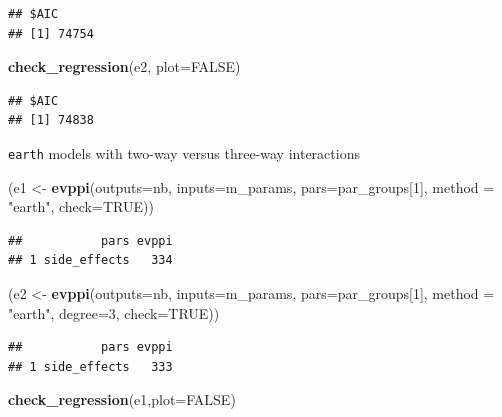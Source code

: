 \documentclass[
]{article}
\newenvironment{Shaded}{\begin{snugshade}}{\end{snugshade}}
\newcommand{\AttributeTok}[1]{\textcolor[rgb]{0.13,0.29,0.53}{#1}}
\newcommand{\ConstantTok}[1]{\textcolor[rgb]{0.56,0.35,0.01}{#1}}
\newcommand{\DecValTok}[1]{\textcolor[rgb]{0.00,0.00,0.81}{#1}}
\newcommand{\FunctionTok}[1]{\textcolor[rgb]{0.13,0.29,0.53}{\textbf{#1}}}
\newcommand{\NormalTok}[1]{#1}
\newcommand{\OtherTok}[1]{\textcolor[rgb]{0.56,0.35,0.01}{#1}}
\newcommand{\StringTok}[1]{\textcolor[rgb]{0.31,0.60,0.02}{#1}}
\begin{document}
\begin{verbatim}
## $AIC
## [1] 74754
\end{verbatim}

\begin{Shaded}
\begin{Highlighting}[]
\FunctionTok{check\_regression}\NormalTok{(e2, }\AttributeTok{plot=}\ConstantTok{FALSE}\NormalTok{)}
\end{Highlighting}
\end{Shaded}

\begin{verbatim}
## $AIC
## [1] 74838
\end{verbatim}

\texttt{earth} models with two-way versus three-way interactions

\begin{Shaded}
\begin{Highlighting}[]
\NormalTok{(e1 }\OtherTok{\textless{}{-}} \FunctionTok{evppi}\NormalTok{(}\AttributeTok{outputs=}\NormalTok{nb, }\AttributeTok{inputs=}\NormalTok{m\_params, }\AttributeTok{pars=}\NormalTok{par\_groups[}\DecValTok{1}\NormalTok{], }\AttributeTok{method =} \StringTok{"earth"}\NormalTok{, }\AttributeTok{check=}\ConstantTok{TRUE}\NormalTok{))}
\end{Highlighting}
\end{Shaded}

\begin{verbatim}
##           pars evppi
## 1 side_effects   334
\end{verbatim}

\begin{Shaded}
\begin{Highlighting}[]
\NormalTok{(e2 }\OtherTok{\textless{}{-}} \FunctionTok{evppi}\NormalTok{(}\AttributeTok{outputs=}\NormalTok{nb, }\AttributeTok{inputs=}\NormalTok{m\_params, }\AttributeTok{pars=}\NormalTok{par\_groups[}\DecValTok{1}\NormalTok{], }\AttributeTok{method =} \StringTok{"earth"}\NormalTok{, }
             \AttributeTok{degree=}\DecValTok{3}\NormalTok{, }\AttributeTok{check=}\ConstantTok{TRUE}\NormalTok{))}
\end{Highlighting}
\end{Shaded}

\begin{verbatim}
##           pars evppi
## 1 side_effects   333
\end{verbatim}

\begin{Shaded}
\begin{Highlighting}[]
\FunctionTok{check\_regression}\NormalTok{(e1,}\AttributeTok{plot=}\ConstantTok{FALSE}\NormalTok{)}
\end{Highlighting}
\end{Shaded}
\end{document}
